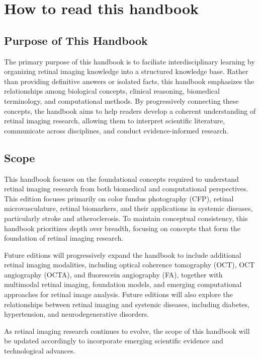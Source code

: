 \chapter*{How to read this handbook}

\section*{Purpose of This Handbook}

The primary purpose of this handbook is to faciliate interdisciplinary learning by organizing retinal imaging knowledge into a structured knowledge base. Rather than providing definitive answers or isolated facts, this handbook emphasizes the relationships among biological concepts, clinical reasoning, biomedical terminology, and computational methods. By progressively connecting these concepts, the handbook aims to help readers develop a coherent understanding of retinal imaging research, allowing them to interpret scientific literature, communicate across disciplines, and conduct evidence-informed research.

\section*{Scope}

This handbook focuses on the foundational concepts required to understand retinal imaging research from both biomedical and computational perspectives. This edition focuses primarily on color fundus photography (CFP), retinal microvasculature, retinal biomarkers, and their applications in systemic diseases, particularly stroke and atheroclerosis. To maintain conceptual consistency, this handbook prioritizes depth over breadth, focusing on concepts that form the foundation of retinal imaging research.

Future editions will progressively expand the handbook to include additional retinal imaging modalities, including optical coherence tomography (OCT), OCT angiography (OCTA), and fluorescein angiography (FA), together with multimodal retinal imaging, foundation models, and emerging computational approaches for retinal image analysis. Future editions will also explore the relationships between retinal imaging and systemic diseases, including diabetes, hypertension, and neurodegenerative disorders.

As retinal imaging research continues to evolve, the scope of this handbook will be updated accordingly to incorporate emerging scientific evidence and technological advances.

